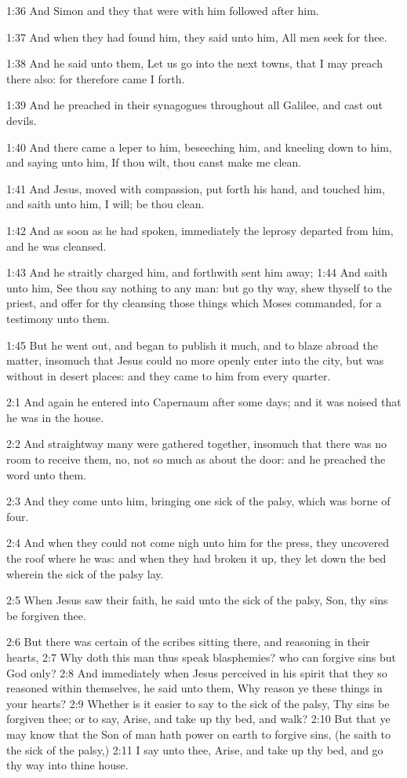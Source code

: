 1:36 And Simon and they that were with him followed after him.

1:37 And when they had found him, they said unto him, All men seek for thee.

1:38 And he said unto them, Let us go into the next towns, that I may preach there also: for therefore came I forth.

1:39 And he preached in their synagogues throughout all Galilee, and cast out devils.

1:40 And there came a leper to him, beseeching him, and kneeling down to him, and saying unto him, If thou wilt, thou canst make me clean.

1:41 And Jesus, moved with compassion, put forth his hand, and touched him, and saith unto him, I will; be thou clean.

1:42 And as soon as he had spoken, immediately the leprosy departed from him, and he was cleansed.

1:43 And he straitly charged him, and forthwith sent him away; 1:44 And saith unto him, See thou say nothing to any man: but go thy way, shew thyself to the priest, and offer for thy cleansing those things which Moses commanded, for a testimony unto them.

1:45 But he went out, and began to publish it much, and to blaze abroad the matter, insomuch that Jesus could no more openly enter into the city, but was without in desert places: and they came to him from every quarter.

2:1 And again he entered into Capernaum after some days; and it was noised that he was in the house.

2:2 And straightway many were gathered together, insomuch that there was no room to receive them, no, not so much as about the door: and he preached the word unto them.

2:3 And they come unto him, bringing one sick of the palsy, which was borne of four.

2:4 And when they could not come nigh unto him for the press, they uncovered the roof where he was: and when they had broken it up, they let down the bed wherein the sick of the palsy lay.

2:5 When Jesus saw their faith, he said unto the sick of the palsy, Son, thy sins be forgiven thee.

2:6 But there was certain of the scribes sitting there, and reasoning in their hearts, 2:7 Why doth this man thus speak blasphemies? who can forgive sins but God only?  2:8 And immediately when Jesus perceived in his spirit that they so reasoned within themselves, he said unto them, Why reason ye these things in your hearts?  2:9 Whether is it easier to say to the sick of the palsy, Thy sins be forgiven thee; or to say, Arise, and take up thy bed, and walk?  2:10 But that ye may know that the Son of man hath power on earth to forgive sins, (he saith to the sick of the palsy,) 2:11 I say unto thee, Arise, and take up thy bed, and go thy way into thine house.

